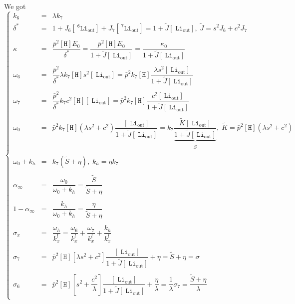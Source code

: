 \documentclass[aps,onecolumn,12pt]{revtex4}
\newcommand{\mychem}[1]{\mathtt{#1}}
\newcommand{\myconc}[1]{\left\lbrack{#1}\right\rbrack}
\newcommand{\spLi}[1]{{~^{\mychem{#1}}\mychem{Li}}}
\newcommand{\spLiOut}[1]{{\spLi{#1}}_{\mathrm{out}}}
\newcommand{\LiOut}[1]{\myconc{\spLiOut{#1}}}
\newcommand{\spproton}{\mychem{H}}
\newcommand{\proton}{\myconc{\spproton}}
\begin{document}
We got
\begin{equation}
\left\lbrace
\begin{array}{rcl}
 k_6 & = & \lambda k_7 \\
 \delta^{\ast} & = & 1+J_6 \LiOut{6} + J_7 \LiOut{7} = 1+\tilde{J}\LiOut{}, \; \tilde{J} = s^2J_6 + c^2J_7\\
 \\
 \kappa & = & \dfrac{\bar{p}^2 \proton E_0}{\delta^\ast} = \dfrac{\bar{p}^2 \proton E_0}{1+\tilde{J}\LiOut{}} = \dfrac{\kappa_0}{1+\tilde{J}\LiOut{}}\\
 \\
 \omega_6& = &  \dfrac{\bar{p}^2}{\delta^\ast} \lambda k_7 \proton s^2 \LiOut{} 
 = \bar{p}^2 k_7 \proton \dfrac{\lambda s^2 \LiOut{}}{1+\tilde{J}\LiOut{}}\\
 \\
 \omega_7&=  &\dfrac{\bar{p}^2}{\delta^\ast} k_7 c^2 \proton \LiOut{} 
 = \bar{p}^2 k_7 \proton \dfrac{ c^2 \LiOut{}}{1+\tilde{J}\LiOut{}}\\
 \\
 \omega_0 & = & \bar{p}^2 k_7 \proton \left(\lambda s^2+c^2\right) \dfrac{\LiOut{}}{1+\tilde{J}\LiOut{}} 
 = k_7  \underbrace{\dfrac{\tilde{K}\LiOut{}}{1+\tilde{J}\LiOut{}}}_{\tilde{S}},\;\tilde{K} = \bar{p}^2 \proton \left(\lambda s^2+c^2\right) \\
 \\
 \omega_0+k_h & = & k_7\left(\tilde{S}+\eta\right),\; k_h = \eta k_7\\
 \\
 \alpha_\infty   & = & \dfrac{\omega_0}{\omega_0+k_h}  = \dfrac{\tilde{S}}{\tilde{S}+\eta}\\
 \\
 1-\alpha_\infty & = & \dfrac{k_h}{\omega_0+k_h} = \dfrac{\eta}{\tilde{S}+\eta}\\
 \\
 \sigma_x & = & \dfrac{\omega_h}{k_x^l} = \dfrac{\omega_6}{k_x^l} + \dfrac{\omega_7}{k_x^l} + \dfrac{k_h}{k_x^l} \\
 \\
 \sigma_7 & = & \bar{p}^2\proton \left[\lambda s^2+c^2\right]\dfrac{\LiOut{}}{1+\tilde{J}\LiOut{}} + \eta = \tilde{S}+\eta = \sigma\\
\\
\sigma_6 & = & {\bar{p}^2\proton} \left[s^2+\dfrac{c^2}{\lambda}\right]\dfrac{\LiOut{}}{1+\tilde{J}\LiOut{}}+\dfrac{\eta}{\lambda} = \dfrac{1}{\lambda} \sigma_7 = \dfrac{\tilde{S}+\eta}{\lambda}\\
\end{array}
\right.
\end{equation}
\end{document}
